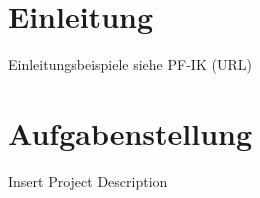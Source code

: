 \section{Einleitung}

\lipsum[3-4]

Einleitungsbeispiele siehe PF-IK (URL)

\section{Aufgabenstellung}\label{sec:projectdescription}

Insert Project Description
